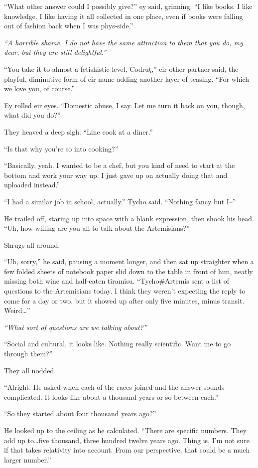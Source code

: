 ``What other answer could I possibly give?'' ey said, grinning. ``I like books. I like knowledge. I like having it all collected in one place, even if books were falling out of fashion back when I was phys-side.''

\emph{``A horrible shame. I do not have the same attraction to them that you do, my dear, but they are still delightful.''}

``You take it to almost a fetishistic level, Codruţ,'' eir other partner said, the playful, diminutive form of eir name adding another layer of teasing. ``For which we love you, of course.''

Ey rolled eir eyes. ``Domestic abuse, I say. Let me turn it back on you, though, what did you do?''

They heaved a deep sigh. ``Line cook at a diner.''

``Is that why you're so into cooking?''

``Basically, yeah. I wanted to be a chef, but you kind of need to start at the bottom and work your way up. I just gave up on actually doing that and uploaded instead.''

``I had a similar job in school, actually.'' Tycho said. ``Nothing fancy but I--''

He trailed off, staring up into space with a blank expression, then shook his head. ``Uh, how willing are you all to talk about the Artemisians?''

Shrugs all around.

``Uh, sorry,'' he said, pausing a moment longer, and then sat up straighter when a few folded sheets of notebook paper slid down to the table in front of him, neatly missing both wine and half-eaten tiramisu. ``Tycho\#Artemis sent a list of questions to the Artemisians today. I think they weren't expecting the reply to come for a day or two, but it showed up after only five minutes, minus transit. Weird\ldots{}''

\emph{``What sort of questions are we talking about?''}

``Social and cultural, it looks like. Nothing really scientific. Want me to go through them?''

They all nodded.

``Alright. He asked when each of the races joined and the answer sounds complicated. It looks like about a thousand years or so between each.''

``So they started about four thousand years ago?''

He looked up to the ceiling as he calculated. ``There are specific numbers. They add up to\ldots five thousand, three hundred twelve years ago. Thing is, I'm not sure if that takes relativity into account. From our perspective, that could be a much larger number.''

